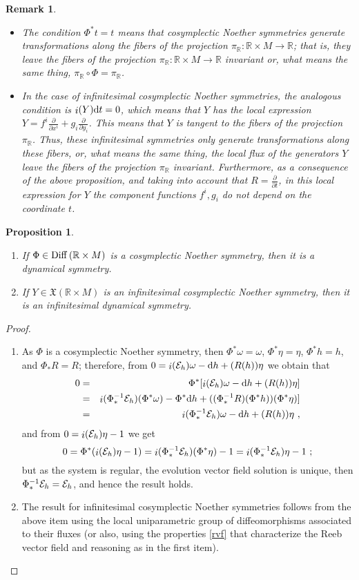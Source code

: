 \documentclass[12pt]{report}
\newtheorem{prop}[teor]{Proposition}
\newtheorem{remark}[teor]{Remark}
\def\beann{\begin{eqnarray*}}
\def\eeann{\end{eqnarray*}}
\def\ben{\begin{enumerate}}
\def\een{\end{enumerate}}
\def\derpar#1#2{\frac{\partial{#1}}{\partial{#2}}}
\def\qed{\ifvmode\removelastskip\fi
{\unskip\nobreak\hfil\penalty50\hbox{}\nobreak\hfil
\hbox{\vrule height1.2ex width1.2ex}\parfillskip=0pt
\finalhyphendemerits=0 \par\smallskip}}
\def\vf{\mathfrak X}
\def\d{{\rm d}}
\def\Real{\mathbb{R}}
\def\inn{\mathop{i}\nolimits}
\begin{document}
\begin{remark}{\rm 
\begin{itemize}
 \item
The condition $\Phi^*t=t$ means that
cosymplectic Noether symmetries generate transformations along
the fibers of the projection
 $\pi_\Real\colon \Real\times M\longrightarrow\Real$; that
is, they leave the fibers of the projection
 $\pi_\Real\colon \Real\times M\longrightarrow\Real$ invariant or,
 what means the same thing,
$\pi_\Real\circ \Phi=\pi_\Real$.
\item
In the case of infinitesimal cosymplectic Noether symmetries, the
analogous condition is $\inn(Y)\d t=0$, which means that $Y$ has
the local expression
$\displaystyle Y=f^i\frac{\partial}{\partial x^i}+g_i\frac{\partial}{\partial y_i}$.
This means that $Y$ is tangent to the fibers of the projection
 $\pi_\Real$. Thus, these infinitesimal symmetries only generate 
transformations along these fibers, or, what means the same thing, 
the local flux of the generators $Y$ leave the fibers of the projection
 $\pi_\Real$ invariant.
 Furthermore, as a consequence of the above proposition,
 and taking into account that $\displaystyle R=\derpar{}{t}$,
in this local expression for $Y$
the component functions $f^i,g_i$ do not depend on the coordinate $t$.
\end{itemize}
}\end{remark}

\begin{prop}
\ben
\item
If $\Phi\in{\rm Diff}\, (\Real\times M)$ is a cosymplectic Noether symmetry, then it is a
dynamical symmetry.
\item
If $Y\in\vf(\Real\times M)$ is an infinitesimal cosymplectic Noether symmetry, then it is
an infinitesimal dynamical symmetry.
\een
\label{simdin2}
\end{prop}
\begin{proof}
\ben
\item
As $\Phi$ is a  cosymplectic Noether symmetry, then
$\Phi^*\omega=\omega$, $\Phi^*\eta=\eta$, $\Phi^*h=h$,
and $\Phi_*R=R$; therefore, from 
$0=\inn({\cal E}_h)\omega-\d h+(R(h))\eta$ we obtain that
\beann
0&=&\Phi^*[\inn({\cal E}_h)\omega-\d h+(R(h))\eta]\\
&=&\inn(\Phi_*^{-1}{\cal E}_h)(\Phi^*\omega)-\Phi^*\d h
+((\Phi_*^{-1}R)(\Phi^*h))(\Phi^*\eta)]
\\ &=&
\inn(\Phi_*^{-1}{\cal E}_h)\omega-\d h+(R(h))\eta \ ,
\eeann
and from $0=\inn({\cal E}_h)\eta-1$ we get
$$
0=\Phi^*(\inn({\cal E}_h)\eta-1)=\inn(\Phi_*^{-1}{\cal E}_h)(\Phi^*\eta)-1=
\inn(\Phi_*^{-1}{\cal E}_h)\eta-1 \ ;
$$
but as the system is regular, the evolution vector field solution is unique,
then $\Phi_*^{-1}{\cal E}_h={\cal E}_h$, and hence the result holds.
\item
The result for infinitesimal cosymplectic Noether symmetries follows
from the above item using the local uniparametric group of diffeomorphisms
associated to their fluxes
(or also, using the properties \eqref{rvf} that characterize the
Reeb vector field and reasoning as in the first item).
\een
\qed \end{proof}
\end{document}
